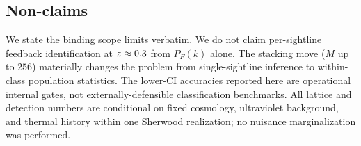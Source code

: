 \subsection{Non-claims}
\label{sec:results:nonclaims}

We state the binding scope limits verbatim. We do not claim per-sightline
feedback identification at $z\approx0.3$ from $P_F(k)$ alone. The stacking move
($M$ up to $256$) materially changes the problem from single-sightline inference
to within-class population statistics. The lower-CI accuracies reported here are
operational internal gates, not externally-defensible classification benchmarks.
All lattice and detection numbers are conditional on fixed cosmology, ultraviolet
background, and thermal history within one Sherwood realization; no nuisance
marginalization was performed.
